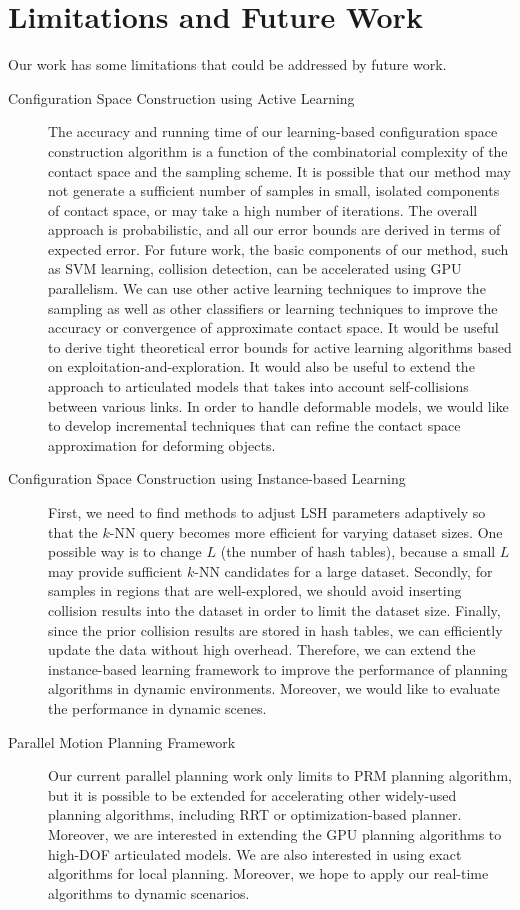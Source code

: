 \section{Limitations and Future Work}
Our work has some limitations that could be addressed by future work.
\begin{description}
\item[Configuration Space Construction using Active Learning]
The accuracy and running time of our learning-based configuration space construction algorithm is a function of the combinatorial complexity of the contact
space and the sampling scheme. It is possible that our method may not generate a sufficient number of samples in small,
isolated components of contact space, or may take a high number of iterations.
The overall approach is probabilistic, and all our error bounds are derived in terms of expected error.
For future work, the basic components of our method, such as SVM learning, collision detection, can be accelerated using GPU parallelism. We can use other active learning techniques to improve the sampling as well as other classifiers or learning techniques to improve the accuracy or convergence of approximate contact space. It would be useful to derive tight theoretical error bounds for active learning algorithms based on exploitation-and-exploration. It would also be useful to extend the approach to articulated models that takes into account self-collisions between various links.
In order to handle deformable models, we would like to develop incremental techniques that can refine the contact
space approximation for deforming objects.
\item[Configuration Space Construction using Instance-based Learning] First, we need to find methods to adjust LSH parameters adaptively so that the $k$-NN query becomes more efficient for varying dataset sizes. One possible way is to change $L$ (the number of hash tables), because a small $L$ may provide sufficient $k$-NN candidates for a large dataset. Secondly, for samples in regions that are well-explored, we should avoid inserting collision results into the dataset in order to limit the dataset size. Finally, since the prior collision results are stored in hash tables, we can efficiently update the data without high overhead. Therefore, we can extend the instance-based learning framework to improve the performance of planning algorithms in dynamic environments. Moreover, we would like to evaluate the performance in dynamic scenes.
\item[Parallel Motion Planning Framework] Our current parallel planning work only limits to PRM planning algorithm, but it is possible to be extended for accelerating other widely-used planning algorithms, including RRT or optimization-based planner. Moreover, we are interested in extending the GPU planning algorithms to high-DOF articulated models. We are also interested in using exact algorithms for local planning. Moreover, we hope to apply our real-time algorithms to dynamic scenarios.

\end{description}
